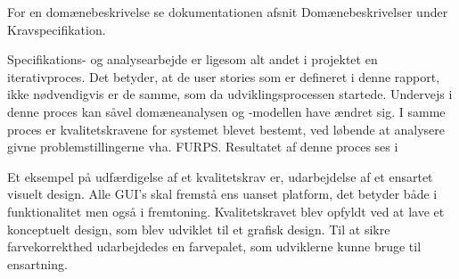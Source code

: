 For en domænebeskrivelse se dokumentationen afsnit Domænebeskrivelser under Kravspecifikation.

Specifikations- og analysearbejde er ligesom alt andet i projektet en iterativproces. Det betyder, at de user stories som er defineret i denne rapport, ikke nødvendigvis er de samme, som da udviklingsprocessen startede. Undervejs i denne proces kan såvel domæneanalysen og -modellen have ændret sig. I samme proces er kvalitetskravene for systemet blevet bestemt, ved løbende at analysere givne problemstillingerne vha. FURPS. Resultatet af denne proces ses i  

Et eksempel på udfærdigelse af et kvalitetskrav er, udarbejdelse af et ensartet visuelt design. Alle GUI's skal fremstå ens uanset platform, det betyder både i funktionalitet men også i fremtoning. Kvalitetskravet blev opfyldt ved at lave et konceptuelt design, som blev udviklet til et grafisk design. Til at sikre farvekorrekthed udarbejdedes en farvepalet, som udviklerne kunne bruge til ensartning.




